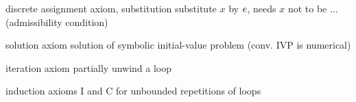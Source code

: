 \documentclass[10pt]{report}
\begin{document}
\begin{calculus}
        \cinferenceRule[Ib|I]{}{
            \linferenceRule[impl]{
                \dbox{\hrepeat{\asprg}}{(\asfml\limply\dbox{\asprg}{\asfml})}
            }{
                (\asfml\limply\dbox{\hrepeat{\asprg}}{\asfml})
            }
        }{}
        \cinferenceRule[Vb|V]{}{
            \linferenceRule[impl]{
                \asfml
            }{
                \dbox{\asprg}{\asfml}
            }
        }{$\freevars{\asfml}\cap\boundvars{\asprg}=\emptyset$}


    \end{calculus}

    discrete assignment axiom, substitution
    substitute $x$ by $e$, needs $x$ not to be ... (admissibility condition)

    solution axiom
    solution of symbolic initial-value problem (conv. IVP is numerical)

    iteration axiom
    partially unwind a loop

    induction axioms I and C for unbounded repetitions of loops
\end{document}
